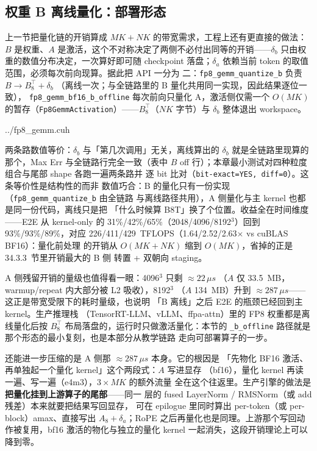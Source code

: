 \subsection{权重 B 离线量化：部署形态}\label{sec:35-b-offline}

上一节把量化链的开销算成 $MK+NK$ 的带宽需求，工程上还有更直接的做法：
$B$ 是权重、$A$ 是激活，这个不对称决定了两侧不必付出同等的开销——$\delta_b$
只由权重的数值分布决定，一次算好即可随 checkpoint 落盘；$\delta_a$
依赖当前 token 的取值范围，必须每次前向现算。据此把 API 一分为
二：\texttt{fp8\_gemm\_quantize\_b} 负责 $B\to B_8^{\top}+\delta_b$
（离线一次；与全链路里的 B 量化共用同一实现，因此结果逐位一致），
\texttt{fp8\_gemm\_bf16\_b\_offline} 每次前向只量化 A，激活侧仅需一个
$O(MK)$ 的暂存（\texttt{Fp8GemmActivation}）——$B_8^{\top}$（$NK$
字节）与 $\delta_b$ 整体退出 workspace。

\begin{lstinputlisting}[linerange={922-955},firstnumber=auto,
  title={fp8\_gemm.cuh L922-955（fp8\_gemm\_bf16\_b\_offline：只量化 A，B 从离线产物取）}]{../fp8_gemm.cuh}
\end{lstinputlisting}

两条路数值等价：$\delta_b$ 与「第几次调用」无关，离线算出的
$\delta_b$ 就是全链路里现算的那个，Max Err 与全链路行完全一致（表中
$B$ off 行）；本章最小测试对四种粒度组合与尾部 shape 各跑一遍两条路并
逐 bit 比对（\texttt{bit-exact=YES, diff=0}）。这条等价性是结构性的而非
数值巧合：B 的量化只有一份实现（\texttt{fp8\_gemm\_quantize\_b} 由全链路
与离线路径共用），A 侧量化与主 kernel 也都是同一份代码，离线只是把
「什么时候算 B8T」换了个位置。收益全在时间维度——E2E 从 kernel-only 的
31\%/42\%/65\%（2048/4096/8192$^3$）回到 93\%/93\%/89\%，对应
226/411/429~TFLOPS（1.64/2.52/2.63$\times$ vs cuBLAS BF16）：量化前处理
的开销从 $O(MK{+}NK)$ 缩到 $O(MK)$，省掉的正是 34.3.3~节里开销最大的 B 侧
转置 + 双朝向 staging。

A 侧残留开销的量级也值得看一眼：4096$^3$ 只剩 $\approx 22\,\mu s$
（$A$ 仅 33.5~MB，warmup/repeat 内大部分被 L2 吸收），8192$^3$
（$A$ 134~MB）升到 $\approx 287\,\mu s$——这正是带宽受限下的耗时量级，也说明
「B 离线」之后 E2E 的瓶颈已经回到主 kernel。生产推理栈
（TensorRT-LLM、vLLM、ffpa-attn）里的 FP8 权重都是离线量化后按
$B_8^{\top}$ 布局落盘的，运行时只做激活量化：本节的
\texttt{\_b\_offline} 路径就是那个形态的最小复刻，也是本部分从教学链路
走向可部署算子的一步。

还能进一步压缩的是 A 侧那 $\approx 287\,\mu s$ 本身。它的根因是
「先物化 BF16 激活、再单独起一个量化 kernel」这个两段式：$A$ 写进显存
（bf16），量化 kernel 再读一遍、写一遍（e4m3），$3\times MK$ 的额外流量
全在这个往返里。生产引擎的做法是\textbf{把量化挂到上游算子的尾部}——同一
层的 fused LayerNorm / RMSNorm（或 add 残差）本来就要把结果写回显存，
可在 epilogue 里同时算出 per-token（或 per-block）amax、直接写出
$A_8+\delta_a$；RoPE 之后再量化也是同理。上游那个写回动作被复用，bf16
激活的物化与独立的量化 kernel 一起消失，这段开销理论上可以降到零。

